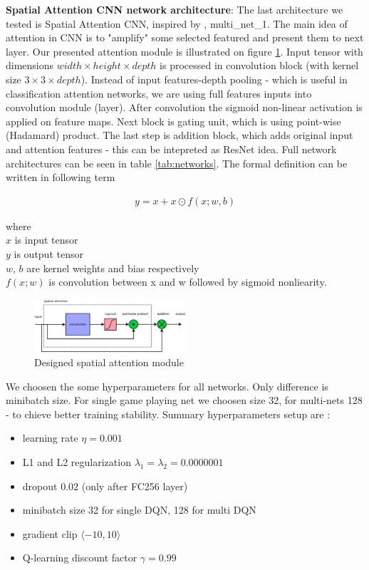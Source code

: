 \documentclass[10pt,a4paper]{article}
\begin{document}
{\bf Spatial Attention CNN network architecture}:
The last architecture we tested is Spatial Attention CNN, inspired by \cite{bib:cbam}, multi\_net\_1.
The main idea of attention in CNN is to "amplify" some selected featured and present them to next layer.
Our presented attention module is illustrated on figure \ref{img:spatial_attention_module}.
Input tensor with dimensions $width \times height \times depth$ is processed in convolution block (with kernel size $3 \times 3 \times depth$).
Instead of input features-depth pooling - which is useful in classification attention networks, we are using full features inputs into convolution module (layer).
After convolution the sigmoid non-linear activation is applied on feature maps. Next block is gating unit, which is using point-wise (Hadamard) product.
The last step is addition block, which adds original input and attention features - this can be intepreted as ResNet idea. Full network architectures can be seen in table \ref{tab:networks}.
The formal definition can be written in following term

\begin{align}
y = x + x \odot f(x; w, b)
\end{align}

where \\
$x$ is input tensor \\
$y$ is output tensor \\
$w$, $b$ are kernel weights and bias respectively \\
$f(x; w)$ is convolution between x and w followed by sigmoid nonliearity.

\begin{figure}[htb!]
\centering
\includegraphics[width=0.5\textwidth]{diagrams/spatial_attention.png}
\caption{Designed spatial attention module}
\label{img:spatial_attention_module}
\end{figure}

We choosen the some hyperparameters for all networks. Only difference is minibatch size. For single game playing net we choosen size 32, for multi-nets 128 - to chieve better
training stability. Summary hyperparameters setup are :
\begin{itemize}
    \item learning rate $\eta = 0.001$
    \item L1 and L2 regularization $\lambda _1 = \lambda _2 = 0.0000001$
    \item dropout $0.02$ (only after FC256 layer)
    \item minibatch size 32 for single DQN, 128 for multi DQN
    \item gradient clip $\langle -10, 10 \rangle$
    \item Q-learning discount factor $\gamma = 0.99$
\end{itemize}
\end{document}

